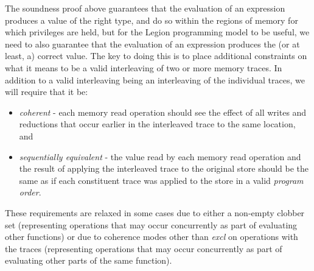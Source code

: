 The soundness proof above guarantees that the evaluation of an expression produces a value of the
right type, and do so within the regions of memory for which privileges are held, but for the
Legion programming model to be useful, we need to also guarantee that the evaluation of an expression
produces the (or at least, a) correct value.  The key to doing this is to place additional 
constraints on what it means to be a valid interleaving of two or more memory traces.  In
addition to a valid interleaving being an interleaving of the individual traces, we will 
require that it be:
\begin{itemize}
\item {\em coherent} - each memory read operation should see the effect of all writes and reductions 
that occur earlier in the interleaved trace to the same location, and
\item {\em sequentially equivalent} - the value read by each memory read operation and the result of applying the interleaved trace to the original store should be the same as if each constituent trace
was applied to the store in a valid {\em program order}.
\end{itemize}
These requirements are relaxed in some cases due to either a non-empty clobber set (representing
operations that may occur concurrently as part of evaluating other functions) or due to coherence
modes other than {\em excl} on operations with the traces (representing operations that may 
occur concurrently as part of evaluating other parts of the same function).

